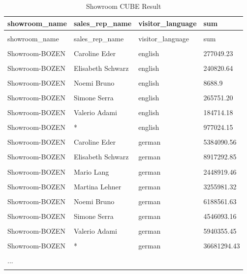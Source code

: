 \documentclass[letterpaper,12pt]{article}
\begin{document}
\begingroup
\renewcommand\arraystretch{0.5}
\begin{longtable}{p{4cm}p{4cm}p{4cm}p{4cm}}
        \caption{Showroom CUBE Result} \\
				showroom\_name & sales\_rep\_name & visitor\_language & sum \\
        \endfirsthead \\
        showroom\_name & sales\_rep\_name & visitor\_language & sum \\
        \endhead \\
Showroom-BOZEN & Caroline Eder & english & 277049.23 \\
\hline \\
Showroom-BOZEN & Elisabeth Schwarz & english & 240820.64 \\
\hline \\
Showroom-BOZEN & Noemi Bruno & english & 8688.9 \\
\hline \\
Showroom-BOZEN & Simone Serra & english & 265751.20 \\
\hline \\
Showroom-BOZEN & Valerio Adami & english & 184714.18 \\
\hline \\
Showroom-BOZEN & * & english & 977024.15 \\
\hline \\
Showroom-BOZEN & Caroline Eder & german & 5384090.56 \\
\hline \\
Showroom-BOZEN & Elisabeth Schwarz & german & 8917292.85 \\
\hline \\
Showroom-BOZEN & Mario Lang & german & 2448919.46 \\
\hline \\
Showroom-BOZEN & Martina Lehner & german & 3255981.32 \\
\hline \\
Showroom-BOZEN & Noemi Bruno & german & 6188561.63 \\
\hline \\
Showroom-BOZEN & Simone Serra & german & 4546093.16 \\
\hline \\
Showroom-BOZEN & Valerio Adami & german & 5940355.45 \\
\hline \\
Showroom-BOZEN & * & german & 36681294.43 \\
\hline \\

... \\
\hline \\
\end{longtable} 
\endgroup           
\end{document}
